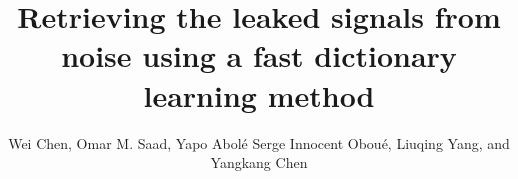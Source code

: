 
\DeclareRobustCommand{\dlo}[1]{}
\DeclareRobustCommand{\wen}[1]{#1}

\title{Retrieving the leaked signals from noise using a fast dictionary learning method}
\author{Wei Chen\footnotemark[1]\footnotemark[2], Omar M. Saad\footnotemark[3], Yapo Abol{\'e} Serge Innocent Obou{\'e}\footnotemark[4], Liuqing Yang\footnotemark[5], and Yangkang Chen\footnotemark[6]}
\renewcommand{\thefootnote}{\fnsymbol{footnote}}

\address{
\footnotemark[1] Key Laboratory of Exploration Technology for Oil and Gas Resources of Ministry of Education\\
Yangtze University\\
Daxue Road No.111\\
Caidian District\\
Wuhan, China, 430100 \\
\footnotemark[2] Hubei Cooperative Innovation Center of Unconventional Oil and Gas\\
Daxue Road No.111\\
Caidian District\\
Wuhan, China, 430100 \\
\footnotemark[3]
Seismology Department\\
National Research Institute of Astronomy and Geophysics (NRIAG)\\
Helwan 11731, Egypt \\
\footnotemark[4]
School of Earth Sciences\\
Zhejiang University\\
Hangzhou, Zhejiang Province, China, 310027\\
yangkang.chen@zju.edu.cn \\
\footnotemark[5]State Key Laboratory of Petroleum Resources and Prospecting \\
China University of Petroleum \\
Fuxue Road 18th\\
Beijing, China, 102200 \\
\footnotemark[6]Bureau of Economic Geology\\
The University of Texas at Austin\\
University Station, Box X\\
Austin, Texas 78713-8924\\
chenyk2016@gmail.com \\
}


